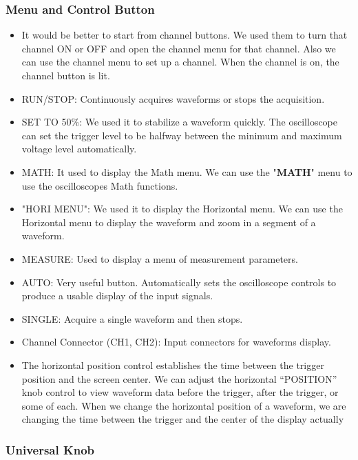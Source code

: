\subsubsection*{Menu and Control Button}
\begin{itemize}
	\item It would be better to start from channel buttons. We used them to turn that channel ON or OFF and open the channel menu for that channel. Also we can use the channel menu to
  set up a channel. When the channel is on, the channel button is lit.
	\item RUN/STOP: Continuously acquires waveforms or stops the acquisition.
	\item SET TO 50\unit{\percent}: We used it to stabilize a waveform quickly. The oscilloscope can set the trigger level to be halfway between the minimum and maximum
  voltage level automatically.
	\item MATH: It used to display the Math menu. We can use the "\textbf{MATH}" menu to use the
  oscilloscopes Math functions.
	\item "HORI MENU": We used it to display the Horizontal menu. We can use the Horizontal
  menu to display the waveform and zoom in a segment of a waveform.
	\item MEASURE: Used to display a menu of measurement parameters.
	\item AUTO: Very useful button. Automatically sets the oscilloscope controls to produce a usable display
  of the input signals.
	\item SINGLE: Acquire a single waveform and then stops.
	\item Channel Connector (CH1, CH2): Input connectors for waveforms display.
	\item The horizontal position control establishes the time between the trigger position
  and the screen center. We can adjust the horizontal “POSITION” knob control to
  view waveform data before the trigger, after the trigger, or some of each. When
  we change the horizontal position of a waveform, we are changing the time
  between the trigger and the center of the display actually
\end{itemize}

\subsubsection*{Universal Knob}

